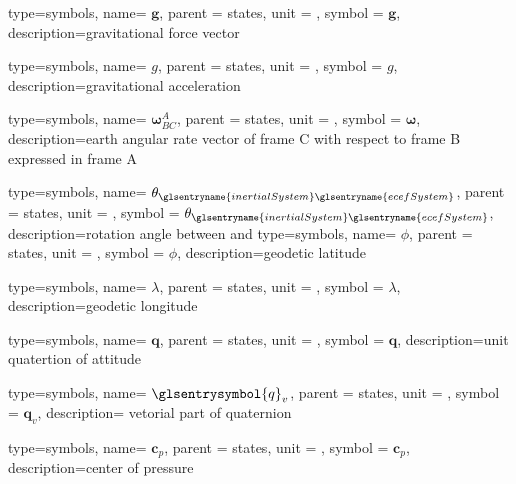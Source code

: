 {type=symbols,
    name= \ensuremath{\mathbf{g}},
    parent = {states},
    unit = \unexpanded{},
    symbol = \ensuremath{\mathbf{g}},
    description={gravitational force vector}
}

{type=symbols,
    name= \ensuremath{g},
    parent = {states},
    unit = \unexpanded{\si{\meter\per\second\squared}},
    symbol = \ensuremath{g},
    description={gravitational acceleration}
}

{type=symbols,
    name= \ensuremath{\boldsymbol{\omega}_{BC}^{A}},
    parent = {states},
    unit = \unexpanded{\si{\radian\per\second}},
    symbol = \ensuremath{\boldsymbol{\omega}},
    description={earth angular rate vector of frame C with respect to frame B expressed in frame A}
}

{type=symbols,
    name= \ensuremath{\theta_{\glsentryname{inertialSystem}\glsentryname{ecefSystem}}},
    parent = {states},
    unit = \unexpanded{\si{\radian\per\second}},
    symbol = \ensuremath{\theta_{\glsentryname{inertialSystem}\glsentryname{ecefSystem}}},
    description={rotation angle between  and }
}
{type=symbols,
    name= \ensuremath{\phi},
    parent = {states},
    unit = \unexpanded{\si{\radian}},
    symbol = \ensuremath{\phi},
    description={geodetic latitude}
}

{type=symbols,
    name= \ensuremath{\lambda},
    parent = {states},
    unit = \unexpanded{\si{\radian}},
    symbol = \ensuremath{\lambda},
    description={geodetic longitude}
}


{type=symbols,
    name= \ensuremath{\mathbf{q}},
    parent = {states},
    unit = \unexpanded{},
    symbol = \ensuremath{\mathbf{q}},
    description={unit quatertion of attitude}
}

{type=symbols,
    name= \ensuremath{\glsentrysymbol{q}_v},
    parent = {states},
    unit = {},
    symbol = \ensuremath{\mathbf{q}_v},
    description={ vetorial part of quaternion }
}

{type=symbols,
    name= \ensuremath{\mathbf{c}_p},
    parent = {states},
    unit = \unexpanded{\si{\meter}},
    symbol = \ensuremath{\mathbf{c}_p},
    description={center of pressure}
}

